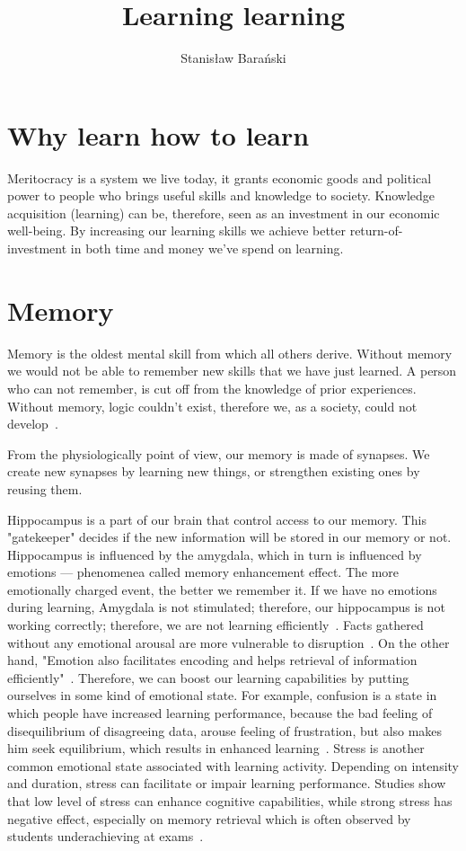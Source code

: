 \documentclass{article}
\title{Learning learning}
\author{Stanisław Barański}
\begin{document}
\maketitle

\section{Why learn how to learn}
Meritocracy is a system we live today, it grants economic goods and political power to people who brings useful skills and knowledge to society.  Knowledge acquisition (learning) can be, therefore, seen as an investment in our economic well-being. By increasing our learning skills we achieve better return-of-investment in both time and money we've spend on learning. 

\section{Memory}
Memory is the oldest mental skill from which all others derive. Without memory we would not be able to remember new skills that we have just learned. A person who can not remember, is cut off from the knowledge of prior experiences. Without memory, logic couldn't exist, therefore we, as a society, could not develop~\cite{csikszentmihalyi1990flow}.

From the physiologically point of view, our memory is made of synapses. We create new synapses by learning new things, or strengthen existing ones by reusing them.

Hippocampus is a part of our brain that control access to our memory. This "gatekeeper" decides if the new information will be stored in our memory or not. Hippocampus is influenced by the amygdala, which in turn is influenced by emotions — phenomenea called memory enhancement effect. The more emotionally charged event, the better we remember it. If we have no emotions during learning, Amygdala is not stimulated; therefore, our hippocampus is not working correctly; therefore, we are not learning efficiently~\cite{phelps2004human, tyng2017influences}. Facts gathered without any emotional arousal are more vulnerable to disruption~\cite{doi:10.1111/1467-9280.00090}. On the other hand, "Emotion also facilitates encoding and helps retrieval of information efficiently"~\cite{tyng2017influences}. Therefore, we can boost our learning capabilities by putting ourselves in some kind of emotional state. For example, confusion is a state in which people have increased learning performance, because the bad feeling of disequilibrium of disagreeing data, arouse feeling of frustration, but also makes him seek equilibrium, which results in enhanced learning~\cite{d2014confusion}. Stress is another common emotional state associated with learning activity. Depending on intensity and duration, stress can facilitate or impair learning performance. Studies show that low level of stress can enhance cognitive capabilities, while strong stress has negative effect, especially on memory retrieval which is often observed by students underachieving at exams~\cite{vogel2016learning}.
\end{document}
